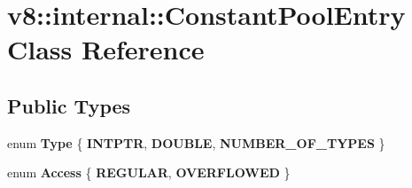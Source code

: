 \hypertarget{classv8_1_1internal_1_1ConstantPoolEntry}{}\section{v8\+:\+:internal\+:\+:Constant\+Pool\+Entry Class Reference}
\label{classv8_1_1internal_1_1ConstantPoolEntry}
\subsection*{Public Types}
\begin{DoxyCompactItemize}
\item 
\mbox{\label{classv8_1_1internal_1_1ConstantPoolEntry_a7544bf628d1729f4c2043ac53cf4eb34}} 
enum {\bfseries Type} \{ {\bfseries I\+N\+T\+P\+TR}, 
{\bfseries D\+O\+U\+B\+LE}, 
{\bfseries N\+U\+M\+B\+E\+R\+\_\+\+O\+F\+\_\+\+T\+Y\+P\+ES}
 \}
\item 
\mbox{\label{classv8_1_1internal_1_1ConstantPoolEntry_a3b552e534b5468e4b9fc4c6dfc67e3c8}} 
enum {\bfseries Access} \{ {\bfseries R\+E\+G\+U\+L\+AR}, 
{\bfseries O\+V\+E\+R\+F\+L\+O\+W\+ED}
 \}
\end{DoxyCompactItemize}
